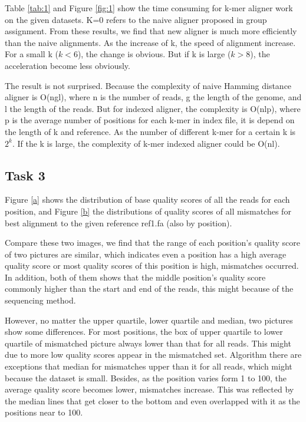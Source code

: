 \documentclass[a4paper]{article}
\begin{document}
Table \ref{tab:1} and Figure \ref{fig:1} show the time consuming for k-mer aligner work on the given datasets. K=0 refers to the naive aligner proposed in group assignment. From these results, we find that new aligner is much more efficiently than the naive alignments. As the increase of k, the speed of alignment increase. For a small k ($k<6$), the change is obvious. But if k is large ($k>8$), the acceleration become less obviously.

The result is not surprised. Because the  complexity of naive Hamming distance aligner is O(ngl), where n is the number of reads, g the length of the genome, and l the length of the reads. But for indexed aligner, the complexity is O(nlp), where p is the average number of positions for each k-mer in index file, it is depend on the length of k and reference. As the number of different k-mer for a certain k is $2^k$. If the k is large, the complexity of k-mer indexed aligner could be O(nl).

\subsection{Task 3}

Figure \ref{a}  shows the distribution of base quality scores of all the reads for each position, and Figure \ref{b} the distributions of quality scores of all mismatches for best alignment to the given reference ref1.fa  (also by position). 

Compare these two images, we find that the range of each position's quality score of two pictures are similar, which indicates even a position has a high average quality score or most quality scores of this position is high, mismatches occurred.  In addition, both of them shows that the middle position's quality score commonly higher than the start and end of the reads, this might because of the sequencing method.

However, no matter the upper quartile, lower quartile and median, two pictures show some differences. For most positions, the box of upper quartile to lower quartile of mismatched picture always lower than that for all reads. This might due to more low quality scores appear in the mismatched set.  Algorithm there are exceptions that median for mismatches upper than it for all reads, which might because the dataset is small. Besides, as the position varies form 1 to 100, the average quality score becomes lower, mismatches increase. This was reflected by the median lines that get closer to the bottom and even overlapped with it as the positions near to 100.
\end{document}
